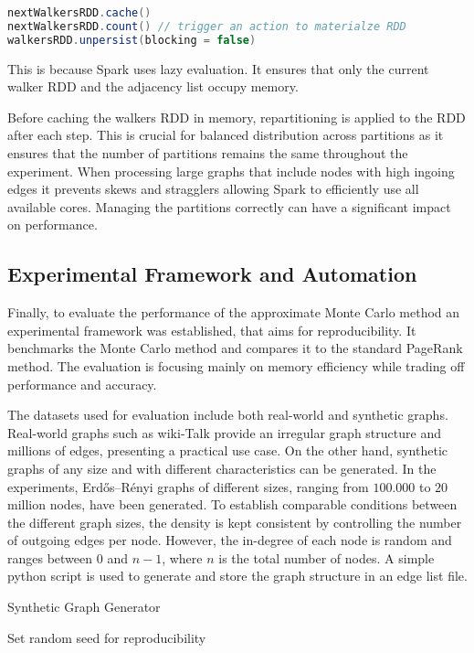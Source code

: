 \begin{lstlisting}[language=Scala, caption={Materializing and Unpersisting Walker RDD}, label={lst:materialize}]
nextWalkersRDD.cache() 
nextWalkersRDD.count() // trigger an action to materialze RDD
walkersRDD.unpersist(blocking = false)
\end{lstlisting}
\vspace{0.5em}
This is because Spark uses lazy evaluation. It ensures that only the current walker RDD and the adjacency list occupy memory. \par
Before caching the walkers RDD in memory, repartitioning is applied to the RDD after each step. This is crucial for balanced distribution across partitions as it ensures that the number of partitions remains the same throughout the experiment. 
When processing large graphs that include nodes with high ingoing edges it prevents skews and stragglers allowing Spark to efficiently use all available cores. Managing the partitions correctly can have a significant impact on performance. 


\subsection{Experimental Framework and Automation}

Finally, to evaluate the performance of the approximate Monte Carlo method an experimental framework was established, that aims for reproducibility. It benchmarks the Monte Carlo method and compares it to the standard PageRank method. The evaluation is focusing mainly on memory efficiency while trading off performance and accuracy. \par
The datasets used for evaluation include both real-world and synthetic graphs. Real-world graphs such as wiki-Talk provide an irregular graph structure and millions of edges, presenting a practical use case. On the other hand, synthetic graphs of any size and with different characteristics can be generated. In the experiments, Erdős–Rényi graphs of different sizes, ranging from $100.000$ to $20$ million nodes, have been generated. To establish comparable conditions between the different graph sizes, the density is kept consistent by controlling the number of outgoing edges per node. However, the in-degree of each node is random and ranges between $0$ and $n-1$, where $n$ is the total number of nodes. A simple python script is used to generate and store the graph structure in an edge list file.

\begin{algorithm}[H]
\caption{Synthetic Graph Generator}

Set random seed for reproducibility\;
\end{algorithm} 

